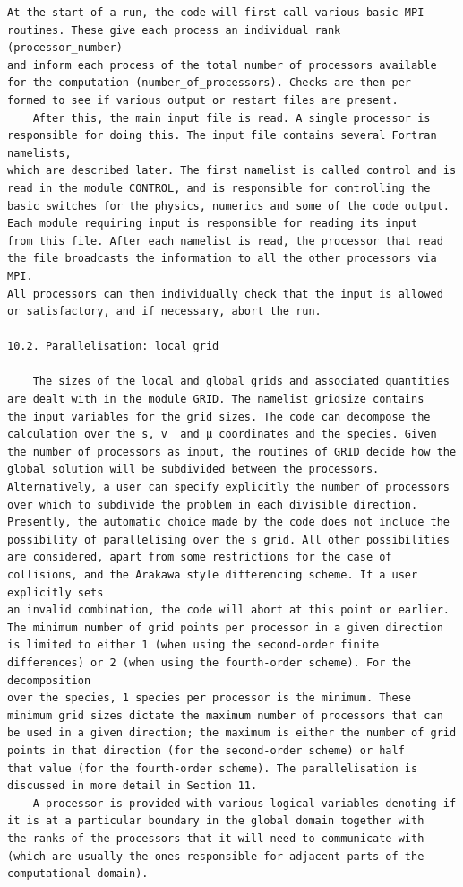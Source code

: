 \documentclass[a4paper]{article}
\newcommand{\gkwpagefont}{\fontsize{6.0pt}{7.55pt}\selectfont}
\begin{document}
\begin{Verbatim}[fontsize=\gkwpagefont]
    At the start of a run, the code will first call various basic MPI routines. These give each process an individual rank (processor_number)
and inform each process of the total number of processors available for the computation (number_of_processors). Checks are then per-
formed to see if various output or restart files are present.
    After this, the main input file is read. A single processor is responsible for doing this. The input file contains several Fortran namelists,
which are described later. The first namelist is called control and is read in the module CONTROL, and is responsible for controlling the
basic switches for the physics, numerics and some of the code output. Each module requiring input is responsible for reading its input
from this file. After each namelist is read, the processor that read the file broadcasts the information to all the other processors via MPI.
All processors can then individually check that the input is allowed or satisfactory, and if necessary, abort the run.

10.2. Parallelisation: local grid

    The sizes of the local and global grids and associated quantities are dealt with in the module GRID. The namelist gridsize contains
the input variables for the grid sizes. The code can decompose the calculation over the s, v  and μ coordinates and the species. Given
the number of processors as input, the routines of GRID decide how the global solution will be subdivided between the processors.
Alternatively, a user can specify explicitly the number of processors over which to subdivide the problem in each divisible direction.
Presently, the automatic choice made by the code does not include the possibility of parallelising over the s grid. All other possibilities
are considered, apart from some restrictions for the case of collisions, and the Arakawa style differencing scheme. If a user explicitly sets
an invalid combination, the code will abort at this point or earlier. The minimum number of grid points per processor in a given direction
is limited to either 1 (when using the second-order finite differences) or 2 (when using the fourth-order scheme). For the decomposition
over the species, 1 species per processor is the minimum. These minimum grid sizes dictate the maximum number of processors that can
be used in a given direction; the maximum is either the number of grid points in that direction (for the second-order scheme) or half
that value (for the fourth-order scheme). The parallelisation is discussed in more detail in Section 11.
    A processor is provided with various logical variables denoting if it is at a particular boundary in the global domain together with
the ranks of the processors that it will need to communicate with (which are usually the ones responsible for adjacent parts of the
computational domain).
\end{Verbatim}
\end{document}
